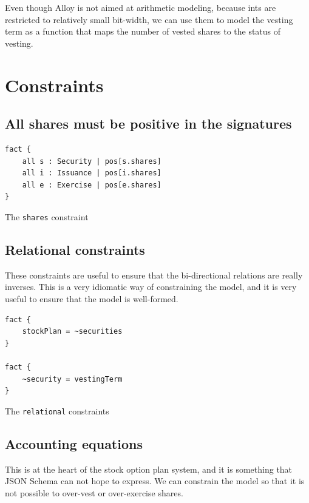 Even though Alloy is not aimed at arithmetic modeling, because ints are restricted to relatively small bit-width, we can use them to model the vesting term as a function that maps the number of vested shares to the status of vesting.

\section{Constraints}

\subsection{All shares must be positive in the signatures}

\begin{listing}[!h]
\begin{verbatim}
fact {
    all s : Security | pos[s.shares]
    all i : Issuance | pos[i.shares]
    all e : Exercise | pos[e.shares]
}
\end{verbatim}
\caption{The \texttt{shares} constraint}
\label{lst:shares-constraint-2}
\end{listing}


\subsection{Relational constraints}

These constraints are useful to ensure that the bi-directional relations are really inverses. This is a very idiomatic way of constraining the model, and it is very useful to ensure that the model is well-formed.

\begin{listing}[!h]
\begin{verbatim}
fact { 
    stockPlan = ~securities 
}

fact {
    ~security = vestingTerm
}
\end{verbatim}
\caption{The \texttt{relational} constraints}
\label{lst:relational-constraints-2}
\end{listing}


\subsection{Accounting equations}

This is at the heart of the stock option plan system, and it is something that JSON Schema can not hope to express. We can constrain the model so that it is not possible to over-vest or over-exercise shares.

